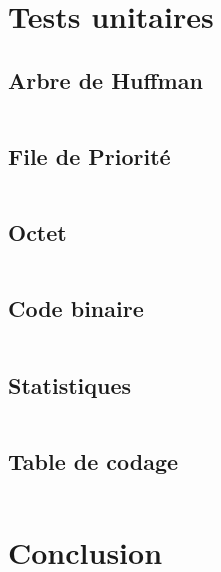 \documentclass[12pt,a4paper]{article}
\begin{document}
\newpage

\section{Tests unitaires}
\subsection{Arbre de Huffman}
    \inputminted[breaklines]{c}{../code/src/tests/testArbre.c}
\subsection{File de Priorité}
    \inputminted[breaklines]{c}{../code/src/tests/testFile.c}
\subsection{Octet}
    \inputminted[breaklines]{c}{../code/src/tests/testOctet.c}
\subsection{Code binaire}
    \inputminted[breaklines]{c}{../code/src/tests/testCodeBinaire.c}
\subsection{Statistiques}
    \inputminted[breaklines]{c}{../code/src/tests/testStats.c}
\subsection{Table de codage}
    \inputminted[breaklines]{c}{../code/src/tests/testTable.c}

\newpage

\section*{Conclusion}

\end{document}
